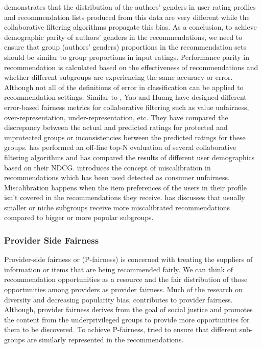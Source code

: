 \cite{ekstrand2018exploring} demonstrates that the distribution of the authors' genders in user rating profiles and recommendation lists produced from this data are very different while the collaborative filtering algorithms propagate this bias. As a conclusion, to achieve demographic parity of authors' genders in the recommendations, we need to ensure that group (authors' genders) proportions in the recommendation sets should be similar to group proportions in input ratings. 
Performance parity in recommendation is calculated based on the effectiveness of recommendations and whether different subgroups are experiencing the same accuracy or error. Although not all of the definitions of error in classification can be applied to recommendation settings. Similar to \cite{kamishima2016model}, Yao and Huang \cite{yao_huang_fatml-2017} have designed different error-based fairness metrics for collaborative filtering such as value unfairness, over-representation, under-representation, etc. They have compared the discrepancy between the actual and predicted ratings for protected and unprotected groups or inconsistencies between the predicted ratings for these groups. 
\cite{ekstrand2018all} has performed an off-line top-N evaluation of several collaborative filtering algorithms and has compared the results of different user demographics based on their NDCG.
\cite{steck2018calibrated} introduces the concept of miscalibration in recommendations which has been used detected as consumer unfairness. Miscalibration happens when the item preferences of the users in their profile isn't covered in the recommendations they receive. \cite{Kun2020calib} has discusses that usually smaller or niche subgroups receive more miscalibrated recommendations compared to bigger or more popular subgroups.
    
        
        
\subsubsection{Provider Side Fairness}        
Provider-side fairness or (P-fairness) is concerned with treating the suppliers of information or items that are being recommended fairly. We can think of recommendation opportunities as a resource and the fair distribution of those opportunities among providers as provider fairness. 
Much of the research on diversity and decreasing popularity bias, contributes to provider fairness. Although, provider fairness derives from the goal of social justice and promotes the content from the underprivileged groups to provide more opportunities for them to be discovered. 
To achieve P-fairness, \cite{mehtora2018towards} tried to ensure that different sub-groups are similarly represented in the recommendations.
    
